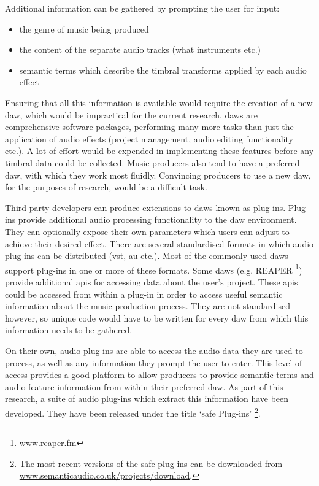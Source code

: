 		Additional information can be gathered by prompting the user for input:

		\begin{itemize}
			\item the genre of music being produced
			\item the content of the separate audio tracks (what instruments etc.)
			\item semantic terms which describe the timbral transforms applied by each audio
			      effect
		\end{itemize}

		Ensuring that all this information is available would require the creation of a new \acrshort{daw}, which
		would be impractical for the current research. \acrshort{daw}s are comprehensive software packages,
		performing many more tasks than just the application of audio effects (project management, audio editing
		functionality etc.). A lot of effort would be expended in implementing these features before any timbral
		data could be collected. Music producers also tend to have a preferred \acrshort{daw}, with which they
		work most fluidly. Convincing producers to use a new \acrshort{daw}, for the purposes of research, would
		be a difficult task.

		Third party developers can produce extensions to \acrshort{daw}s known as plug-ins. Plug-ins provide
		additional audio processing functionality to the \acrshort{daw} environment. They can optionally expose
		their own parameters which users can adjust to achieve their desired effect. There are several standardised
		formats in which audio plug-ins can be distributed (\acrshort{vst}, \acrshort{au} etc.). Most of the
		commonly used \acrshort{daw}s support plug-ins in one or more of these formats. Some \acrshort{daw}s (e.g.
		REAPER \footnote{\href{http://www.reaper.fm}{www.reaper.fm}}) provide additional \acrshort{api}s for
		accessing data about the user's project. These \acrshort{api}s could be accessed from within a plug-in in
		order to access useful semantic information about the music production process. They are not standardised
		however, so unique code would have to be written for every \acrshort{daw} from which this information needs
		to be gathered. 
		
		On their own, audio plug-ins are able to access the audio data they are used to process, as well as any
		information they prompt the user to enter. This level of access provides a good platform to allow producers
		to provide semantic terms and audio feature information from within their preferred \acrshort{daw}. As part
		of this research, a suite of audio plug-ins which extract this information have been developed. They have
		been released under the title `\acrfull{safe} Plug-ins' \footnote{The most recent versions of the
		\acrshort{safe} plug-ins can be downloaded from \href{http://www.semanticaudio.co.uk/projects/download/}
		{www.semanticaudio.co.uk/projects/download}.}.

